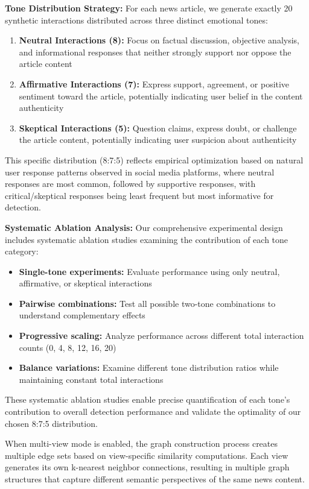 \textbf{Tone Distribution Strategy:} For each news article, we generate exactly 20 synthetic interactions distributed across three distinct emotional tones:
\begin{enumerate}
\item \textbf{Neutral Interactions (8):} Focus on factual discussion, objective analysis, and informational responses that neither strongly support nor oppose the article content
\item \textbf{Affirmative Interactions (7):} Express support, agreement, or positive sentiment toward the article, potentially indicating user belief in the content authenticity
\item \textbf{Skeptical Interactions (5):} Question claims, express doubt, or challenge the article content, potentially indicating user suspicion about authenticity
\end{enumerate}

This specific distribution (8:7:5) reflects empirical optimization based on natural user response patterns observed in social media platforms, where neutral responses are most common, followed by supportive responses, with critical/skeptical responses being least frequent but most informative for detection.

\textbf{Systematic Ablation Analysis:} Our comprehensive experimental design includes systematic ablation studies examining the contribution of each tone category:
\begin{itemize}
\item \textbf{Single-tone experiments:} Evaluate performance using only neutral, affirmative, or skeptical interactions
\item \textbf{Pairwise combinations:} Test all possible two-tone combinations to understand complementary effects
\item \textbf{Progressive scaling:} Analyze performance across different total interaction counts (0, 4, 8, 12, 16, 20)
\item \textbf{Balance variations:} Examine different tone distribution ratios while maintaining constant total interactions
\end{itemize}

These systematic ablation studies enable precise quantification of each tone's contribution to overall detection performance and validate the optimality of our chosen 8:7:5 distribution.

When multi-view mode is enabled, the graph construction process creates multiple edge sets based on view-specific similarity computations. Each view generates its own k-nearest neighbor connections, resulting in multiple graph structures that capture different semantic perspectives of the same news content.

